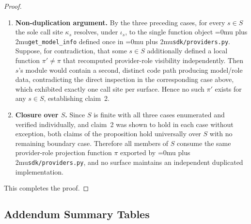 \documentclass[12pt]{article}
\theoremstyle{definition}
\DeclareRobustCommand{\code}[1]{\begingroup\Urlmuskip=0mu plus 2mu\relax\nolinkurl{#1}\endgroup}
\begin{document}
\begin{proof}
\begin{enumerate}
  \item \textbf{Non-duplication argument.} By the three preceding
  cases, for every $s \in S$ the sole call site $\kappa_s$ resolves,
  under $\iota_s$, to the single function object \code{get\_model\_info}
  defined once in \code{sdk/providers.py}. Suppose, for
  contradiction, that some $s \in S$ additionally defined a local
  function $\pi' \neq \pi$ that recomputed provider-role visibility
  independently. Then $s$'s module would contain a second, distinct
  code path producing model/role data, contradicting the direct
  inspection in the corresponding case above, which exhibited exactly
  one call site per surface. Hence no such $\pi'$ exists for any
  $s \in S$, establishing claim~2.

  \item \textbf{Closure over $S$.} Since $S$ is finite with all three
  cases enumerated and verified individually, and claim~2 was shown
  to hold in each case without exception, both claims of the
  proposition hold universally over $S$ with no remaining boundary
  case. Therefore all members of $S$ consume the same provider-role
  projection function $\pi$ exported by \code{sdk/providers.py}, and
  no surface maintains an independent duplicated implementation.
\end{enumerate}
This completes the proof.
\end{proof}

\subsection{Addendum Summary Tables}
\label{app:addendum-summary-tables}
\end{document}
